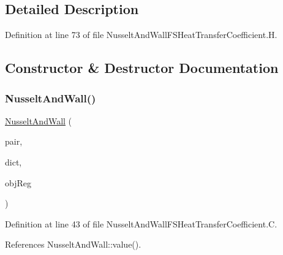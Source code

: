 \subsection{Detailed Description}


Definition at line 73 of file Nusselt\+And\+Wall\+F\+S\+Heat\+Transfer\+Coefficient.\+H.



\subsection{Constructor \& Destructor Documentation}
\mbox{\label{classFoam_1_1FSHeatTransferCoefficientModels_1_1NusseltAndWall_ae4faac0669cfbc58941d115052696750}} 
\subsubsection{\texorpdfstring{Nusselt\+And\+Wall()}{NusseltAndWall()}}
{\footnotesize\ttfamily \hyperlink{classFoam_1_1FSHeatTransferCoefficientModels_1_1NusseltAndWall}{Nusselt\+And\+Wall} (\begin{DoxyParamCaption}\item[{const \hyperlink{classFoam_1_1FSPair}{F\+S\+Pair} \&}]{pair,  }\item[{const dictionary \&}]{dict,  }\item[{const object\+Registry \&}]{obj\+Reg }\end{DoxyParamCaption})}



Definition at line 43 of file Nusselt\+And\+Wall\+F\+S\+Heat\+Transfer\+Coefficient.\+C.



References Nusselt\+And\+Wall\+::value().

